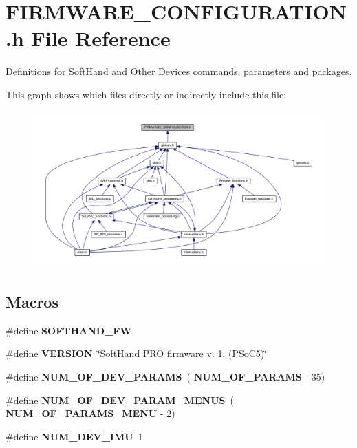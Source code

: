 \section{F\+I\+R\+M\+W\+A\+R\+E\+\_\+\+C\+O\+N\+F\+I\+G\+U\+R\+A\+T\+I\+O\+N.\+h File Reference}
\label{_f_i_r_m_w_a_r_e___c_o_n_f_i_g_u_r_a_t_i_o_n_8h}


Definitions for Soft\+Hand and Other Devices commands, parameters and packages.  


This graph shows which files directly or indirectly include this file\+:\nopagebreak
\begin{figure}[H]
\begin{center}
\leavevmode
\includegraphics[width=350pt]{_f_i_r_m_w_a_r_e___c_o_n_f_i_g_u_r_a_t_i_o_n_8h__dep__incl}
\end{center}
\end{figure}
\subsection*{Macros}
\begin{DoxyCompactItemize}
\item 
\mbox{\label{_f_i_r_m_w_a_r_e___c_o_n_f_i_g_u_r_a_t_i_o_n_8h_a93636c25cdc0c3ffd278002222a49ea0}} 
\#define {\bfseries S\+O\+F\+T\+H\+A\+N\+D\+\_\+\+FW}
\item 
\mbox{\label{_f_i_r_m_w_a_r_e___c_o_n_f_i_g_u_r_a_t_i_o_n_8h_a1c6d5de492ac61ad29aec7aa9a436bbf}} 
\#define {\bfseries V\+E\+R\+S\+I\+ON}~\char`\"{}Soft\+Hand P\+RO firmware v. 1. (P\+So\+C5)\char`\"{}
\item 
\mbox{\label{_f_i_r_m_w_a_r_e___c_o_n_f_i_g_u_r_a_t_i_o_n_8h_ac79ae2689d5f07061b26e1004563f525}} 
\#define {\bfseries N\+U\+M\+\_\+\+O\+F\+\_\+\+D\+E\+V\+\_\+\+P\+A\+R\+A\+MS}~(\textbf{ N\+U\+M\+\_\+\+O\+F\+\_\+\+P\+A\+R\+A\+MS} -\/ 35)
\item 
\mbox{\label{_f_i_r_m_w_a_r_e___c_o_n_f_i_g_u_r_a_t_i_o_n_8h_aee84094e250fb6a0493716b9d7cecc95}} 
\#define {\bfseries N\+U\+M\+\_\+\+O\+F\+\_\+\+D\+E\+V\+\_\+\+P\+A\+R\+A\+M\+\_\+\+M\+E\+N\+US}~(\textbf{ N\+U\+M\+\_\+\+O\+F\+\_\+\+P\+A\+R\+A\+M\+S\+\_\+\+M\+E\+NU} -\/ 2)
\item 
\#define \textbf{ N\+U\+M\+\_\+\+D\+E\+V\+\_\+\+I\+MU}~1
\end{DoxyCompactItemize}


